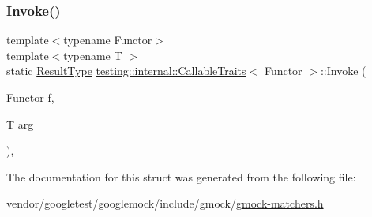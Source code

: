 \mbox{\label{structtesting_1_1internal_1_1_callable_traits_ad54471cad61aefbe15de330867ff5936}} 
\subsubsection{\texorpdfstring{Invoke()}{Invoke()}}
{\footnotesize\ttfamily template$<$typename Functor$>$ \\
template$<$typename T $>$ \\
static \hyperlink{structtesting_1_1internal_1_1_callable_traits_a242d198dd1c56a153ba931d7166ec7f3}{Result\+Type} \hyperlink{structtesting_1_1internal_1_1_callable_traits}{testing\+::internal\+::\+Callable\+Traits}$<$ Functor $>$\+::Invoke (\begin{DoxyParamCaption}\item[{Functor}]{f,  }\item[{T}]{arg }\end{DoxyParamCaption})\hspace{0.3cm}{\ttfamily [inline]}, {\ttfamily [static]}}



The documentation for this struct was generated from the following file\+:\begin{DoxyCompactItemize}
\item 
vendor/googletest/googlemock/include/gmock/\hyperlink{gmock-matchers_8h}{gmock-\/matchers.\+h}\end{DoxyCompactItemize}
